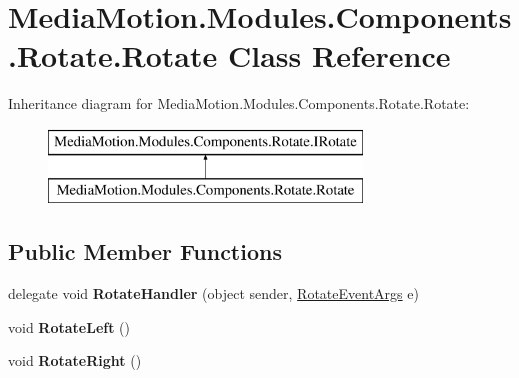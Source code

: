 \hypertarget{class_media_motion_1_1_modules_1_1_components_1_1_rotate_1_1_rotate}{\section{Media\+Motion.\+Modules.\+Components.\+Rotate.\+Rotate Class Reference}
\label{class_media_motion_1_1_modules_1_1_components_1_1_rotate_1_1_rotate}
}
Inheritance diagram for Media\+Motion.\+Modules.\+Components.\+Rotate.\+Rotate\+:\begin{figure}[H]
\begin{center}
\leavevmode
\includegraphics[height=2.000000cm]{class_media_motion_1_1_modules_1_1_components_1_1_rotate_1_1_rotate}
\end{center}
\end{figure}
\subsection*{Public Member Functions}
\begin{DoxyCompactItemize}
\item 
\hypertarget{class_media_motion_1_1_modules_1_1_components_1_1_rotate_1_1_rotate_ad73946e8cf6ebecf8aae436da614658e}{delegate void {\bfseries Rotate\+Handler} (object sender, \hyperlink{class_media_motion_1_1_modules_1_1_components_1_1_rotate_1_1_events_1_1_rotate_event_args}{Rotate\+Event\+Args} e)}\label{class_media_motion_1_1_modules_1_1_components_1_1_rotate_1_1_rotate_ad73946e8cf6ebecf8aae436da614658e}

\item 
\hypertarget{class_media_motion_1_1_modules_1_1_components_1_1_rotate_1_1_rotate_a58f3aa9778c0fdc2ae3f9de2d92b3e66}{void {\bfseries Rotate\+Left} ()}\label{class_media_motion_1_1_modules_1_1_components_1_1_rotate_1_1_rotate_a58f3aa9778c0fdc2ae3f9de2d92b3e66}

\item 
\hypertarget{class_media_motion_1_1_modules_1_1_components_1_1_rotate_1_1_rotate_a3b740126dcc04d7cacb3b0a7089d9bc4}{void {\bfseries Rotate\+Right} ()}\label{class_media_motion_1_1_modules_1_1_components_1_1_rotate_1_1_rotate_a3b740126dcc04d7cacb3b0a7089d9bc4}

\end{DoxyCompactItemize}
